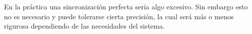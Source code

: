 En la práctica una sincronización perfecta sería algo excesivo. Sin embargo esto no es necesario y puede tolerarse cierta precisión, la cual será más o menos rigurosa dependiendo de las necesidades del sistema.




